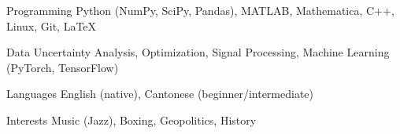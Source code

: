 

\begin{cvskills}
  \cvskill
    {Programming} %
    {Python (NumPy, SciPy, Pandas), MATLAB, Mathematica, C++, Linux, Git, LaTeX}

  \cvskill
    {Data} %
    {Uncertainty Analysis, Optimization, Signal Processing, Machine Learning (PyTorch, TensorFlow)} %

  \cvskill
    {Languages} %
    {English (native), Cantonese (beginner/intermediate)} %

\cvskill
  {Interests} %
  {Music (Jazz), Boxing, Geopolitics, History}






\end{cvskills}
